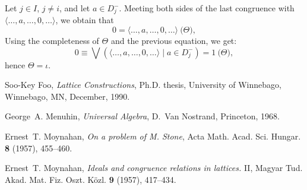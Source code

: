 \documentclass{foils}
\begin{document}

Let $j \in I$, $j \neq i$, and let $a \in D_{j}^{-}$. 
Meeting both sides of the last congruence  
with $\langle \dots, a, \dots, 0, \dots \rangle$, 
we obtain that
\begin{equation*}
   0 = \langle \dots, a, \dots, 0, \dots \rangle 
     \pod{\Theta}, 
\end{equation*}
Using the completeness of $\Theta$ and the previous equation, 
we get:
\[
   0 \equiv \bigvee ( \langle \dots, a, \dots, 0, 
     \dots \rangle \mid a \in D_{j}^{-} ) = 1 
     \pod{\Theta}, 
\]
hence $\Theta = \iota$.

\foilhead{}

\begin{thebibliography}{9}

Soo-Key Foo, 
\emph{Lattice Constructions}, 
Ph.D. thesis, 
University of Winnebago, Winnebago, MN, December, 1990.

George~A. Menuhin, 
\emph{Universal Algebra}, 
D.~Van Nostrand, Princeton, 1968.

Ernest~T. Moynahan, 
\emph{On a problem of M. Stone},
Acta Math. Acad. Sci. Hungar. \textbf{8} (1957), 
455--460.

Ernest~T. Moynahan, 
\emph{Ideals and congruence relations in lattices.} II,
Magyar Tud. Akad. Mat. Fiz. Oszt. K\"{o}zl. \textbf{9} 
(1957), 417--434.

\end{thebibliography}
\end{document}
